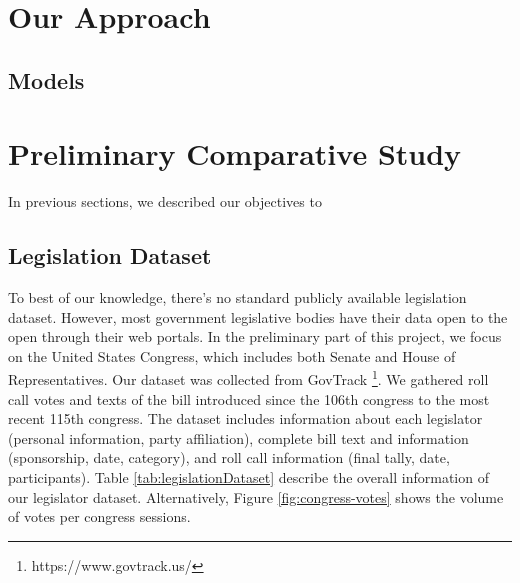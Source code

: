 \section{Our Approach}
\subsection{Models}

\section{Preliminary Comparative Study}
In previous sections, we described our objectives to 


\subsection{Legislation Dataset}
To best of our knowledge, there's no standard publicly available legislation dataset. However, most government legislative bodies have their data open to the open through their web portals. In the preliminary part of this project, we focus on the United States Congress, which includes both Senate and House of Representatives. Our dataset was collected from GovTrack \footnote{https://www.govtrack.us/}. We gathered roll call votes and texts of the bill introduced since the 106th congress to the most recent 115th congress. The dataset includes information about each legislator (personal information, party affiliation), complete bill text and information (sponsorship, date, category), and roll call information (final tally, date, participants). Table \ref{tab:legislationDataset} describe the overall information of our legislator dataset. Alternatively, Figure \ref{fig:congress-votes} shows the volume of votes per congress sessions.  


